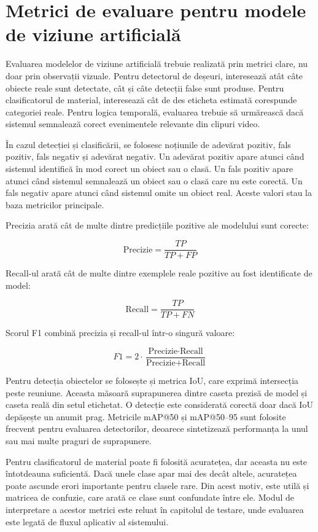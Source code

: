 \section{Metrici de evaluare pentru modele de viziune artificială}

Evaluarea modelelor de viziune artificială trebuie realizată prin metrici clare, nu doar prin observații vizuale. Pentru detectorul de deșeuri, interesează atât câte obiecte reale sunt detectate, cât și câte detecții false sunt produse. Pentru clasificatorul de material, interesează cât de des eticheta estimată corespunde categoriei reale. Pentru logica temporală, evaluarea trebuie să urmărească dacă sistemul semnalează corect evenimentele relevante din clipuri video.

În cazul detecției și clasificării, se folosesc noțiunile de adevărat pozitiv, fals pozitiv, fals negativ și adevărat negativ. Un adevărat pozitiv apare atunci când sistemul identifică în mod corect un obiect sau o clasă. Un fals pozitiv apare atunci când sistemul semnalează un obiect sau o clasă care nu este corectă. Un fals negativ apare atunci când sistemul omite un obiect real. Aceste valori stau la baza metricilor principale.

Precizia arată cât de multe dintre predicțiile pozitive ale modelului sunt corecte:

\[
\text{Precizie} = \frac{TP}{TP + FP}
\]

Recall-ul arată cât de multe dintre exemplele reale pozitive au fost identificate de model:

\[
\text{Recall} = \frac{TP}{TP + FN}
\]

Scorul F1 combină precizia și recall-ul într-o singură valoare:

\[
F1 = 2 \cdot \frac{\text{Precizie} \cdot \text{Recall}}{\text{Precizie} + \text{Recall}}
\]

Pentru detecția obiectelor se folosește și metrica IoU, care exprimă intersecția peste reuniune. Aceasta măsoară suprapunerea dintre caseta prezisă de model și caseta reală din setul etichetat. O detecție este considerată corectă doar dacă IoU depășește un anumit prag. Metricile mAP@50 și mAP@50--95 sunt folosite frecvent pentru evaluarea detectorilor, deoarece sintetizează performanța la unul sau mai multe praguri de suprapunere.

Pentru clasificatorul de material poate fi folosită acuratețea, dar aceasta nu este întotdeauna suficientă. Dacă unele clase apar mai des decât altele, acuratețea poate ascunde erori importante pentru clasele rare. Din acest motiv, este utilă și matricea de confuzie, care arată ce clase sunt confundate între ele. Modul de interpretare a acestor metrici este reluat în capitolul de testare, unde evaluarea este legată de fluxul aplicativ al sistemului.

